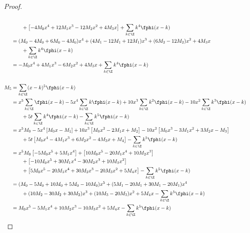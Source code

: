 \begin{proof}
\begin{align*}
      \\&\qquad+ \left[ - 4M_0x^4 + 12M_1x^3 - 12M_2x^2 + 4M_3x  \right]
      +  \sum_{k\in\Z} k^4 \fphi(x-k)
  \\&= (M_0- 4M_0+6M_0- 4M_0)x^4 
      + (4M_1- 12M_1+ 12M_1)x^3
      + (6M_2-12M_2)x^2
      + 4M_3x
      \\&\qquad+ \sum_{k\in\Z} k^4 \fphi(x-k)
  \\&= -M_0x^4 
      + 4M_1x^3
      - 6M_2x^2
      + 4M_3x
      + \sum_{k\in\Z} k^4 \fphi(x-k)
  \\
  \\
  M_5
    &= \sum_{k\in\Z} (x-k)^5  \fphi(x-k)
  \\&=  x^5 \sum_{k\in\Z}     \fphi(x-k)
      - 5x^4 \sum_{k\in\Z} k   \fphi(x-k)
      +10x^3 \sum_{k\in\Z} k^2 \fphi(x-k)
      -10x^2 \sum_{k\in\Z} k^3 \fphi(x-k)
      \\&\qquad+ 5t   \sum_{k\in\Z} k^4 \fphi(x-k)
      -      \sum_{k\in\Z} k^5 \fphi(x-k)
  \\&=  x^5 M_0
      - 5x^4 \left[ M_0x-M_1                 \right]
      +10x^3 \left[ M_0x^2-2M_1x+M_2         \right]
      -10x^2 \left[ M_0x^3-3M_1x^2+3M_2x-M_3 \right]
      \\&\qquad+ 5t   \left[ M_0x^4-4M_1x^3+6M_2x^2-4M_3x+M_4 \right]
      -      \sum_{k\in\Z} k^5 \fphi(x-k)
  \\&=  x^5 M_0
      \left[ -5M_0x^5+5M_1x^4                 \right]
      + \left[ 10M_0x^5 -20M_1x^4 + 10M_2x^3  \right]
      \\&\qquad+ \left[ -10M_0x^5 +30M_1x^4 -30M_2x^3 +10M_3x^2 \right]
      \\&\qquad+ \left[ 5M_0x^5 - 20M_1x^4 +30M_2x^3 - 20M_3x^2 +5M_4x \right]
      - \sum_{k\in\Z} k^5 \fphi(x-k)
  \\&= (M_0-5M_0+10M_0+5M_0-10M_0)x^5
       +(5M_1-20M_1+30M_1-20M_1)x^4
       \\&\qquad+(10M_2-30M_2+30M_2)x^3
       +(10M_3-20M_3)x^2
       + 5M_4x
      - \sum_{k\in\Z} k^5 \fphi(x-k)
  \\&= M_0x^5 - 5M_1x^4 + 10M_2x^3 - 10M_3x^2 + 5M_4x 
      - \sum_{k\in\Z} k^5 \fphi(x-k)
\end{align*}


\end{proof}
